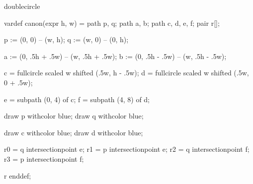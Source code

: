 

\startenvironment doublecircle

	\startMPdefinitions
		vardef canon(expr h, w) =
			path p, q;
			path a, b;
			path c, d, e, f;
			pair r[];


			p := (0, 0) -- (w, h);
			q := (w, 0) -- (0, h);

			a := (0, .5h + .5w) -- (w, .5h + .5w); %
			b := (0, .5h - .5w) -- (w, .5h - .5w); %

			c = fullcircle scaled w shifted (.5w, h - .5w); %
			d = fullcircle scaled w shifted (.5w, 0 + .5w); %

			e = subpath (0, 4) of c; %
			f = subpath (4, 8) of d; %

			draw p withcolor blue;
			draw q withcolor blue;

			draw c withcolor blue;
			draw d withcolor blue;

			r0 = q intersectionpoint e; %
			r1 = p intersectionpoint e; %
			r2 = q intersectionpoint f; %
			r3 = p intersectionpoint f; %

			r
		enddef;
	\stopMPdefinitions

\stopenvironment

